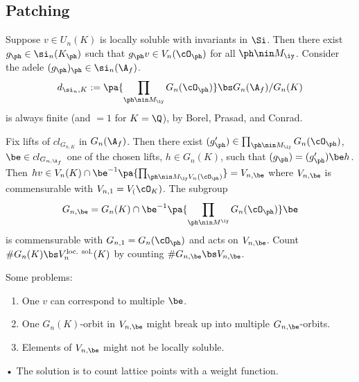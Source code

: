 \subsection{Patching}
Suppose $v\in U_n(K)$ is locally soluble with invariants in $\Si$. Then there exist $g_\ph\in \si_n(K_\ph)$ such that $g_\ph v\in V_n(\cO_\ph)$ for all $\ph\nin M_{\iy}$. Consider the adele $(g_\ph)_\ph\in \si_n(\A_f)$.
\[
d_{\si_n,K}:=\pa{\prod_{\ph\nin M_{\iy}}G_n(\cO_\ph)}\bs G_n(\A_f)/G_n(K)
\]
is always finite (and $=1$ for $K=\Q$), by Borel, Prasad, and Conrad.

Fix lifts of $cl_{G_{n,K}}$ in $G_n(\A_f)$. Then there exist $(g_\ph')\in \prod_{\ph\nin M_{\iy}} G_n(\cO_\ph)$, $\be\in cl_{G_{n,\A_f}}$ one of the chosen lifts, $h\in G_n(K)$, such that $(g_\ph)=(g_\ph')\be h$. Then $hv\in V_n(K)\cap \be^{-1}\pa{\prod_{\ph\nin M_{\iy}V_n(\cO_\ph)}}=V_{n,\be}$ where $V_{n,\be}$ is commensurable with $V_{n,1}=V_(\cO_K)$. The subgroup
\[
G_{n,\be} = G_n(K) \cap \be^{-1}\pa{\prod_{\ph\nin M^{\iy}}G_n(\cO_\ph)}\be
\]
is commensurable with $G_{n,1}=G_n(\cO_\ph)$ and acts on $V_{n,\be}$. Count $\#G_n(K)\bs V_n^{\text{loc. sol.}}(K)$ by counting $\#G_{n,\be}\bs V_{n,\be}$. 

Some problems:
\begin{enumerate}
\item
One $v$ can correspond to multiple $\be$.
\item
One $G_n(K)$-orbit in $V_{n,\be}$ might break up into multiple $G_{n,\be}$-orbits.
\item 
Elements of $V_{n,\be}$ might not be locally soluble.
\end{enumerate}•
The solution is to count lattice points with a weight function.
